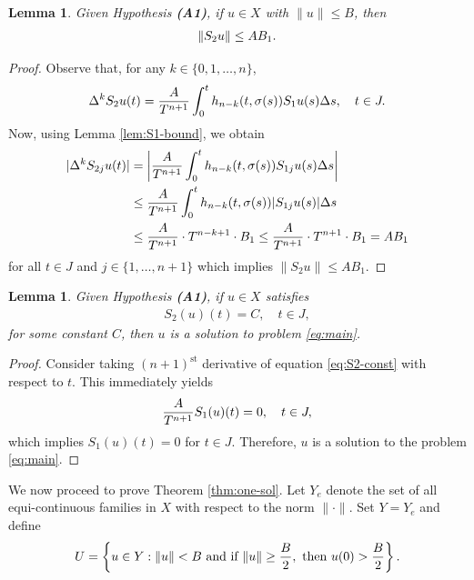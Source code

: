 \documentclass[reqno, 12pt]{amsart}
\newtheorem{lemma}[theorem]{Lemma}
\numberwithin{equation}{section}
\begin{document}
\begin{lemma} \label{lem:S2-bound}
Given Hypothesis {\bf (A1)}, if $u \in X$ with $\|u\| \leq B$, then
\begin{align}
\|S_2u\| \leq AB_1. \notag
\end{align}
\end{lemma}

\begin{proof}
Observe that, for any $k \in \{0, 1, \ldots, n\}$, 
\begin{align}
\Delta^k S_2u(t) = \frac{A}{T^{n+1}} \int_0^t h_{n-k}(t, \sigma(s))S_1u(s)\Delta s, \quad t \in J. \notag
\end{align}
Now, using Lemma \ref{lem:S1-bound}, we obtain
\begin{align}
|\Delta^k S_{2j}u(t)| &= \left|\frac{A}{T^{n+1}} \int_0^t h_{n-k}(t, \sigma(s))S_{1j}u(s)\Delta s\right| \notag\\
&\leq \frac{A}{T^{n+1}} \int_0^t h_{n-k}(t, \sigma(s))|S_{1j}u(s)|\Delta s \notag\\
&\leq \frac{A}{T^{n+1}} \cdot T^{n-k+1} \cdot B_1 \leq \frac{A}{T^{n+1}} \cdot T^{n+1} \cdot B_1 = AB_1 \notag
\end{align}
for all $t \in J$ and $j \in \{1, \ldots, n+1\}$ which implies $\|S_2u\| \leq AB_1$.
\end{proof}

\begin{lemma} \label{lem:S2-sol}
Given Hypothesis {\bf (A1)}, if $u \in X$ satisfies
\begin{align}
S_2(u)(t) = C, \quad t \in J, \label{eq:S2-const}
\end{align}
for some constant $C$, then $u$ is a solution to problem \eqref{eq:main}.
\end{lemma}

\begin{proof}
Consider taking $(n+1)^{\text{st}}$ derivative of equation \eqref{eq:S2-const} with respect to $t$. This immediately yields
\begin{align}
\frac{A}{T^{n+1}}S_1(u)(t) = 0, \quad t \in J, \notag
\end{align}
which implies $S_1(u)(t) = 0$ for $t \in J$. Therefore, $u$ is a solution to the problem \eqref{eq:main}.
\end{proof}
We now proceed to prove Theorem \ref{thm:one-sol}.
Let $Y_e$ denote the set of all equi-continuous families in $X$ with respect to the norm $\|\cdot\|$. Set $Y=Y_e$ and define
\begin{align}
U = \left\{u \in Y : \|u\| < B \text{ and if } \|u\| \geq \frac{B}{2}, \text{ then } u(0) > \frac{B}{2}\right\}. \notag
\end{align}
\end{document}
